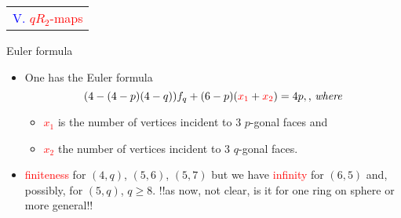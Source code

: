 \documentclass[%
pdf,
colorBG,
slideColor,
]{prosper}
\begin{document}
\begin{slide}{}
\begin{center}
{\Huge 
\begin{tabular*}{8cm}{c}
\\[-0.5cm]
\textcolor{blue}{V. }\textcolor{red}{$qR_2$-maps}\\
\end{tabular*}
}
\end{center}
\end{slide}









\begin{slide}{Euler formula}
\begin{itemize}
\item One has the Euler formula
\begin{equation*}
(4-(4-p)(4-q))f_q+(6-p)(\textcolor{red}{x_1}+\textcolor{red}{x_2})=4p, \mbox{,~{\em where}}
\end{equation*}
\begin{itemize}
\item \textcolor{red}{$x_1$} is the number of vertices incident to $3$ $p$-gonal faces and
\item \textcolor{red}{$x_2$} the number of vertices incident to $3$ $q$-gonal faces.
\end{itemize}
\item \textcolor{red}{finiteness} for $(4,q)$, $(5,6)$, $(5,7)$ but we have \textcolor{red}{infinity} for $(6,5)$ and, possibly, for $(5,q)$, $q\geq 8$.
!!as now, not clear, is it for one ring on sphere or more general!!

\end{itemize}

\end{slide}
\end{document}
